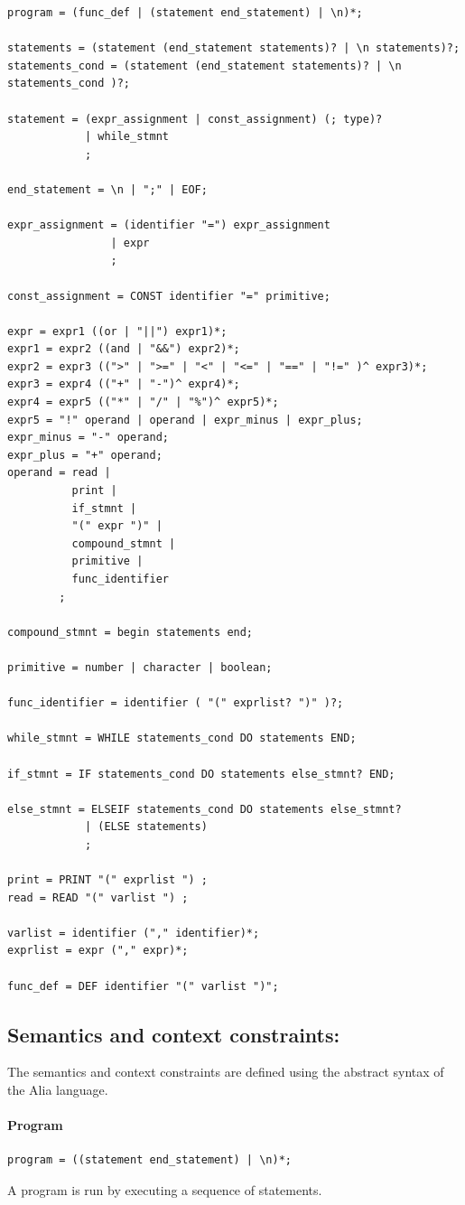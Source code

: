 \documentclass[paper=a4, fontsize=11pt]{article}
\numberwithin{equation}{section}		%
\numberwithin{figure}{section}			%
\numberwithin{table}{section}				%
\begin{document}
\begin{verbatim}
program = (func_def | (statement end_statement) | \n)*;

statements = (statement (end_statement statements)? | \n statements)?;
statements_cond = (statement (end_statement statements)? | \n statements_cond )?;

statement = (expr_assignment | const_assignment) (; type)?
			| while_stmnt 
			;

end_statement = \n | ";" | EOF;

expr_assignment = (identifier "=") expr_assignment
				| expr 
				;

const_assignment = CONST identifier "=" primitive;

expr = expr1 ((or | "||") expr1)*;
expr1 = expr2 ((and | "&&") expr2)*;
expr2 = expr3 ((">" | ">=" | "<" | "<=" | "==" | "!=" )^ expr3)*;
expr3 = expr4 (("+" | "-")^ expr4)*;
expr4 = expr5 (("*" | "/" | "%")^ expr5)*;
expr5 = "!" operand | operand | expr_minus | expr_plus;
expr_minus = "-" operand;
expr_plus = "+" operand;
operand = read |
	   	  print |
	   	  if_stmnt |
	   	  "(" expr ")" |
	   	  compound_stmnt |
	   	  primitive |
	   	  func_identifier
		;
		  
compound_stmnt = begin statements end;

primitive = number | character | boolean;

func_identifier = identifier ( "(" exprlist? ")" )?;

while_stmnt = WHILE statements_cond DO statements END;

if_stmnt = IF statements_cond DO statements else_stmnt? END;

else_stmnt = ELSEIF statements_cond DO statements else_stmnt?
			| (ELSE statements)
			;

print = PRINT "(" exprlist ") ;
read = READ "(" varlist ") ;

varlist = identifier ("," identifier)*;
exprlist = expr ("," expr)*;

func_def = DEF identifier "(" varlist ")";
\end{verbatim}


\subsection*{Semantics and context constraints:}
The semantics and context constraints are defined using the abstract syntax of the Alia language.
\paragraph{Program}
\begin{verbatim}
program = ((statement end_statement) | \n)*;
\end{verbatim}
A program is run by executing a sequence of statements.
\end{document}
